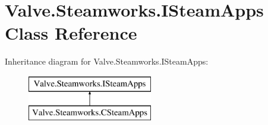 \hypertarget{classValve_1_1Steamworks_1_1ISteamApps}{}\section{Valve.\+Steamworks.\+I\+Steam\+Apps Class Reference}
\label{classValve_1_1Steamworks_1_1ISteamApps}
Inheritance diagram for Valve.\+Steamworks.\+I\+Steam\+Apps\+:\begin{figure}[H]
\begin{center}
\leavevmode
\includegraphics[height=2.000000cm]{classValve_1_1Steamworks_1_1ISteamApps}
\end{center}
\end{figure}
